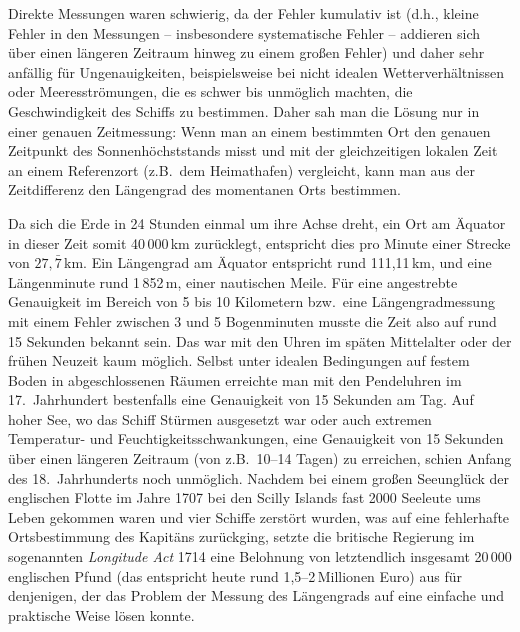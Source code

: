 Direkte Messungen waren schwierig, da der Fehler kumulativ ist (d.h., kleine Fehler in den 
Messungen -- insbesondere systematische Fehler -- 
addieren sich \"uber einen l\"angeren Zeitraum hinweg zu
einem gro\ss en Fehler) und daher sehr anf\"allig f\"ur Ungenauigkeiten, beispielsweise
bei nicht idealen Wetterverh\"altnissen oder Meeresstr\"omungen, die es schwer bis unm\"oglich
machten, die Geschwindigkeit des Schiffs zu bestimmen. 
Daher sah man die L\"osung nur in einer genauen
Zeitmessung: Wenn man an einem bestimmten Ort den genauen Zeitpunkt des
Sonnenh\"ochststands misst und mit der gleichzeitigen lokalen Zeit an einem Referenzort
(z.B.\ dem Heimathafen) vergleicht, kann man aus der Zeitdifferenz den L\"angengrad des momentanen
Orts bestimmen. 

Da sich die Erde in 24 Stunden einmal um ihre Achse dreht, ein Ort am \"Aquator in dieser Zeit somit
40\,000\,km \glqq zur\"ucklegt\grqq, entspricht dies pro Minute einer Strecke von $27,\bar{7}$\,km. 
Ein L\"angengrad am \"Aquator entspricht rund 111,11\,km, und eine L\"angenminute rund 1\,852\,m,
einer nautischen Meile. 
F\"ur eine angestrebte Genauigkeit im Bereich von 5 bis 10 Kilometern bzw.\ eine L\"angengradmessung
mit einem Fehler zwischen 3 und 5 Bogenminuten musste die Zeit also auf
rund 15 Sekunden bekannt sein. Das war mit den Uhren im sp\"aten Mittelalter oder der fr\"uhen
Neuzeit kaum m\"oglich. Selbst unter idealen Bedingungen auf festem Boden in abgeschlossenen
R\"aumen erreichte man mit den Pendeluhren 
im 17.\ Jahrhundert bestenfalls eine Genauigkeit von
15 Sekunden am Tag. Auf hoher See, wo das Schiff St\"urmen ausgesetzt war oder auch extremen
Temperatur- und Feuchtigkeitsschwankungen, eine Genauigkeit von 15 Sekunden \"uber einen l\"angeren
Zeitraum (von z.B.\ 10--14 Tagen) zu erreichen, schien Anfang des 18.\ Jahrhunderts noch unm\"oglich.
Nachdem bei einem gro\ss en Seeungl\"uck der englischen Flotte im Jahre 1707 bei den Scilly Islands 
fast 2000 Seeleute ums Leben gekommen waren und vier Schiffe zerst\"ort wurden, was
auf eine fehlerhafte Ortsbestimmung des Kapit\"ans zur\"uckging, setzte die britische Regierung im
sogenannten \textit{Longitude Act} 
1714 eine Belohnung von letztendlich insgesamt 20\,000 englischen Pfund (das entspricht
heute rund 1,5--2\,Millionen Euro) aus f\"ur denjenigen, der das Problem der Messung des L\"angengrads
auf eine einfache und praktische Weise l\"osen konnte. 

